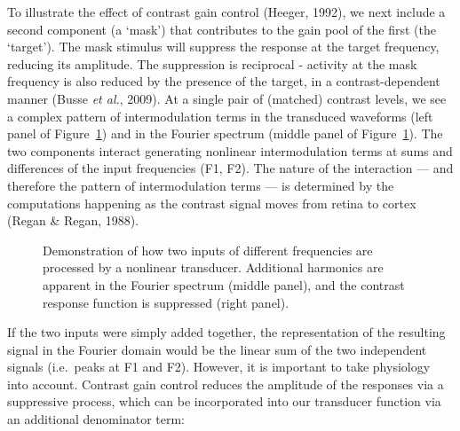 \documentclass[
  letterpaper,
  DIV=11,
  numbers=noendperiod]{scrartcl}
\begin{document}
To illustrate the effect of contrast gain control (Heeger, 1992), we
next include a second component (a `mask') that contributes to the gain
pool of the first (the `target'). The mask stimulus will suppress the
response at the target frequency, reducing its amplitude. The
suppression is reciprocal - activity at the mask frequency is also
reduced by the presence of the target, in a contrast-dependent manner
(Busse \emph{et al.}, 2009). At a single pair of (matched) contrast
levels, we see a complex pattern of intermodulation terms in the
transduced waveforms (left panel of Figure~\ref{fig-twoinputs}) and in
the Fourier spectrum (middle panel of Figure~\ref{fig-twoinputs}). The
two components interact generating nonlinear intermodulation terms at
sums and differences of the input frequencies (F1, F2). The nature of
the interaction --- and therefore the pattern of intermodulation terms
--- is determined by the computations happening as the contrast signal
moves from retina to cortex (Regan \& Regan, 1988).

\begin{figure}


\caption{\label{fig-twoinputs}Demonstration of how two inputs of
different frequencies are processed by a nonlinear transducer.
Additional harmonics are apparent in the Fourier spectrum (middle
panel), and the contrast response function is suppressed (right panel).}

\end{figure}%

If the two inputs were simply added together, the representation of the
resulting signal in the Fourier domain would be the linear sum of the
two independent signals (i.e.~peaks at F1 and F2). However, it is
important to take physiology into account. Contrast gain control reduces
the amplitude of the responses via a suppressive process, which can be
incorporated into our transducer function via an additional denominator
term:
\end{document}

